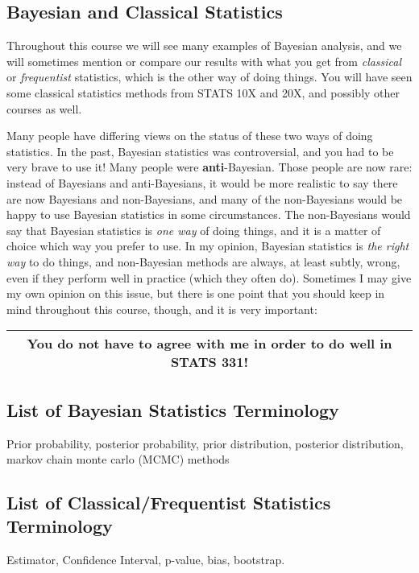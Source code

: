 \subsection{Bayesian and Classical Statistics}
Throughout this course we will see many examples of Bayesian analysis, and we
will sometimes mention or compare our results with what you get from
{\it classical} or {\it frequentist} statistics, which is the other way of
doing things. You will have seen some classical statistics methods from STATS
10X and 20X, and possibly other courses as well.

Many
people have differing views on the status of these two ways of doing statistics.
In the past, Bayesian statistics was controversial, and you had to be very
brave to use it! Many people were {\bf anti}-Bayesian. Those people are now
rare: instead of Bayesians and anti-Bayesians, it would be more realistic to
say there are now Bayesians and non-Bayesians, and many of the non-Bayesians
would be happy to use Bayesian statistics in some circumstances.
The non-Bayesians would say that
Bayesian statistics is {\it one way} of doing things, and it is a matter of
choice which way you prefer to use. In my opinion, Bayesian
statistics is {\it the right way} to do things, and non-Bayesian methods are
always, at least subtly, wrong, even if they perform well in practice (which
they often do). Sometimes I may give my own opinion on this issue, but
there is one point that you should keep in mind throughout
this course, though, and it is very important:

\begin{center}
\begin{tabular}{|c|}
\hline
{\bf You do not have to agree with me in order to do well in STATS 331!}\\
\hline
\end{tabular}
\end{center}

\subsection{List of Bayesian Statistics Terminology}
Prior probability, posterior probability, prior distribution, posterior
distribution, markov chain monte carlo (MCMC) methods

\subsection{List of Classical/Frequentist Statistics Terminology}
Estimator, Confidence Interval, p-value, bias, bootstrap.

